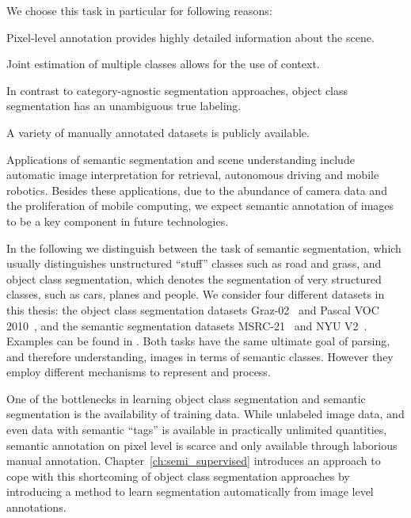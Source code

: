 We choose this task in particular for following reasons:
\begin{itemize*}
    \item Pixel-level annotation provides highly detailed information about the scene.
    \item Joint estimation of multiple classes allows for the use of context.
    \item In contrast to category-agnostic segmentation approaches, object class segmentation
        has an unambiguous true labeling.
    \item A variety of manually annotated datasets is publicly available.
\end{itemize*}
%
Applications of semantic segmentation and scene understanding include automatic
image interpretation for retrieval, autonomous driving and mobile robotics.
Besides these applications, due to the abundance of camera data and the
proliferation of mobile computing, we expect semantic annotation of images to
be a key component in future technologies.

In the following we distinguish between the task of semantic segmentation,
which usually distinguishes unstructured ``stuff'' classes such as road and
grass, and object class segmentation, which denotes the segmentation of very
structured classes, such as cars, planes and people. We consider four
different datasets in this thesis: the object class segmentation datasets
Graz-02~\citep{marszatek2007accurate} and Pascal VOC 2010~\citep{pascal}, and
the semantic segmentation datasets MSRC-21~\citep{shotton2006textonboost} and
NYU V2~\citep{SilbermanECCV12}. Examples can be found in .
%
Both tasks have the same ultimate goal of parsing, and therefore understanding,
images in terms of semantic classes. However they employ different mechanisms
to represent and process.

One of the bottlenecks in learning object class segmentation and semantic
segmentation is the availability of training data.  While unlabeled image data,
and even data with semantic
``tags'' is available in practically unlimited quantities, semantic annotation
on pixel level is scarce and only available through laborious manual annotation. 
Chapter~\ref{ch:semi_supervised} introduces an approach to cope with this
shortcoming of object class segmentation approaches by introducing a method to
learn segmentation automatically from image level annotations.

